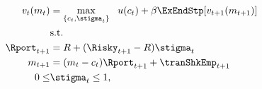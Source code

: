   \begin{equation*}\begin{gathered}\begin{aligned}
        \vFunc_{t}(m_{t})  & = \max_{\{{c}_{t},\stigma_{t}\}}   ~~ \uFunc(c_{t}) +  \DiscFac
        \ExEndStp[{\vFunc}_{t+1}(m_{t+1})]
        \\      & \text{s.t.} \nonumber
        \\      \Rport_{t+1}  & = \Rfree + (\Risky_{t+1}-\Rfree) \stigma_{t}
        \\      m_{t+1}  & = (m_{t}-c_{t})\Rport_{t+1} + \tranShkEmp_{t+1}
        \\  0       \leq & \stigma_{t}  \leq 1, \label{eq:noshorts}
      \end{aligned}\end{gathered}\end{equation*}
